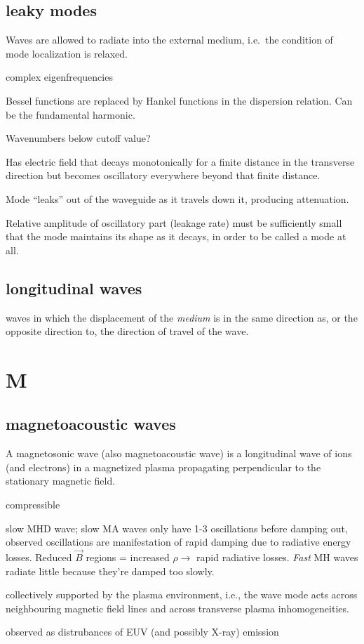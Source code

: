 \documentclass[12pt]{article}
\begin{document}
\subsection*{leaky modes}
\begin{itemize*}
    \item Waves are allowed to radiate into the external medium,
        i.e.\ the condition of mode localization is relaxed.
    \item complex eigenfrequencies
    \item Bessel functions are replaced by Hankel functions in the
        dispersion relation. Can be the fundamental harmonic.
    \item Wavenumbers below cutoff value?
    \item Has electric field that decays monotonically for a finite
        distance in the transverse direction but becomes oscillatory
        everywhere beyond that finite distance.
    \item Mode ``leaks'' out of
        the waveguide as it travels down it, producing attenuation.
    \item Relative amplitude of oscillatory part (leakage rate)
        must be sufficiently small that the mode maintains its
        shape as it decays, in order to be called a mode at all.
\end{itemize*}

\subsection*{longitudinal waves}
waves in which the displacement of the \emph{medium} is in the
same direction as, or the opposite direction to,
the direction of travel of the wave.

\section*{M}
\subsection*{magnetoacoustic waves}
\begin{itemize*}
    \item A magnetosonic wave (also magnetoacoustic wave) is a
        longitudinal wave of ions (and electrons) in a magnetized
        plasma propagating perpendicular to the stationary magnetic field.
    \item compressible
    \item slow MHD wave; slow MA waves only have 1-3 oscillations before
        damping out, observed oscillations are manifestation of rapid
        damping due to radiative energy losses. Reduced $\vec{B}$ regions
        = increased $\rho\rightarrow$ rapid radiative losses. \emph{Fast}
        MH waves radiate little because they're damped too slowly.
    \item collectively supported by the plasma environment, i.e., the wave mode acts
        across neighbouring magnetic field lines and across transverse
        plasma inhomogeneities.
    \item observed as distrubances of EUV (and possibly X-ray) emission
\end{itemize*}
\end{document}
